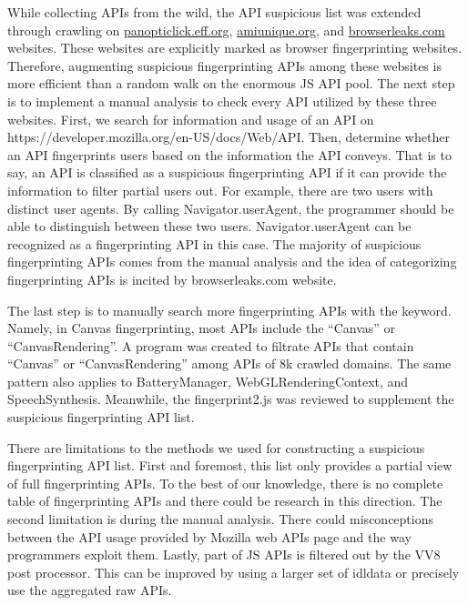 While collecting APIs from the wild, the API suspicious list was extended through crawling on \url{panopticlick.eff.org}, \url{amiunique.org}, and \url{browserleaks.com} websites. These websites are explicitly marked as browser fingerprinting websites. Therefore, augmenting suspicious fingerprinting APIs among these websites is more efficient than a random walk on the enormous JS API pool. The next step is to implement a manual analysis to check every API utilized by these three websites. First, we search for information and usage of an API on https://developer.mozilla.org/en-US/docs/Web/API. Then, determine whether an API fingerprints users based on the information the API conveys. That is to say, an API is classified as a suspicious fingerprinting API if it can provide the information to filter partial users out. For example, there are two users with distinct user agents. By calling Navigator.userAgent, the programmer should be able to distinguish between these two users. Navigator.userAgent can be recognized as a fingerprinting API in this case. The majority of suspicious fingerprinting APIs comes from the manual analysis and the idea of categorizing fingerprinting APIs is incited by browserleaks.com website. 

The last step is to manually search more fingerprinting APIs with the keyword. Namely, in Canvas fingerprinting, most APIs include the ``Canvas'' or ``CanvasRendering''. A program was created to filtrate APIs that contain ``Canvas'' or ``CanvasRendering'' among APIs of 8k crawled domains. The same pattern also applies to BatteryManager, WebGLRenderingContext, and SpeechSynthesis. Meanwhile, the fingerprint2.js was reviewed to supplement the suspicious fingerprinting API list.  

There are limitations to the methods we used for constructing a suspicious fingerprinting API list. First and foremost, this list only provides a partial view of full fingerprinting APIs. To the best of our knowledge, there is no complete table of fingerprinting APIs and there could be research in this direction. The second limitation is during the manual analysis. There could misconceptions between the API usage provided by Mozilla web APIs page and the way programmers exploit them. Lastly, part of JS APIs is filtered out by the VV8 post processor. This can be improved by using a larger set of idldata or precisely use the aggregated raw APIs. 
